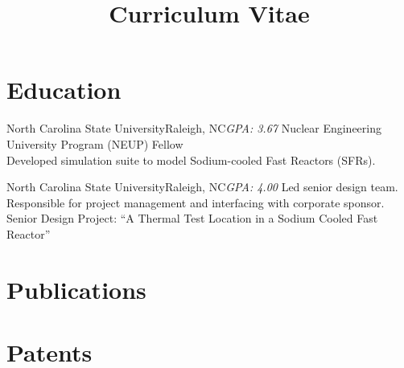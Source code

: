 \documentclass[letterpaper,11pt,nocolor,final]{moderncv}
\title{Curriculum Vitae}
\begin{document}
\maketitle

\nocite{*}


\section{Education}  

    {North Carolina State University}{Raleigh, NC}{\textit{GPA: 3.67}}{
    Nuclear Engineering University Program (NEUP) Fellow \\
    Developed simulation suite to model Sodium-cooled Fast Reactors (SFRs).
    \vspace{-1\topsep}
    \printbibliography[keyword={mastersthesis},heading=none]}
  \vspace{\topsep}

    {North Carolina State University}{Raleigh, NC}{\textit{GPA: 4.00}}{
    Led senior design team. Responsible for project management and interfacing
      with corporate sponsor. \\
    Senior Design Project: ``A Thermal Test Location in a Sodium Cooled Fast
      Reactor''}


\section{Publications}
  \printbibliography[keyword={publications},heading=none]



\section{Patents}
  \printbibliography[keyword={patents},heading=none]
\end{document}

